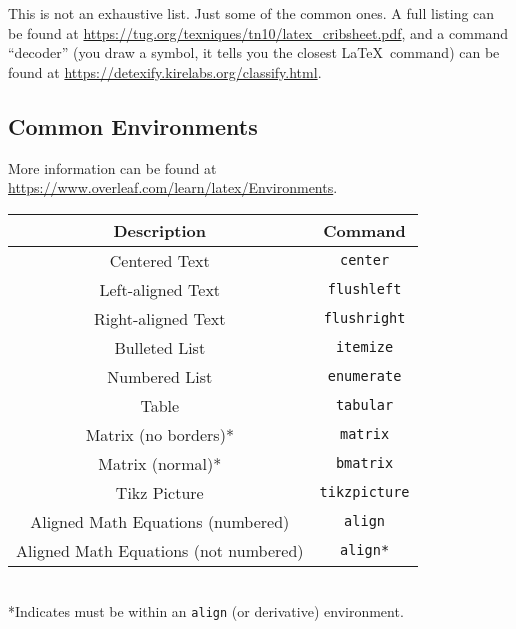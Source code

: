 \documentclass[a4paper,10pt]{article}
\begin{document}
\noindent This is not an exhaustive list. Just some of the common ones. A full listing can be found at \url{https://tug.org/texniques/tn10/latex_cribsheet.pdf}, and a command ``decoder'' (you draw a symbol, it tells you the closest \LaTeX\ command) can be found at \url{https://detexify.kirelabs.org/classify.html}.

\subsection{Common Environments}

More information can be found at \url{https://www.overleaf.com/learn/latex/Environments}.

\begin{center}
	\begin{tabular}{|c|c|} \hline
		\textbf{Description} & \textbf{Command} \\\hline
		Centered Text & \texttt{center} \\
		Left-aligned Text & \texttt{flushleft} \\
		Right-aligned Text & \texttt{flushright} \\
		Bulleted List & \texttt{itemize} \\
		Numbered List & \texttt{enumerate} \\
		Table & \texttt{tabular} \\
		Matrix (no borders)* & \texttt{matrix} \\
		Matrix (normal)* & \texttt{bmatrix} \\
		Tikz Picture & \texttt{tikzpicture} \\
		Aligned Math Equations (numbered) & \texttt{align} \\
		Aligned Math Equations (not numbered) & \texttt{align*} \\ \hline
	\end{tabular} \\
	*Indicates must be within an \texttt{align} (or derivative) environment.
\end{center}
\end{document}
